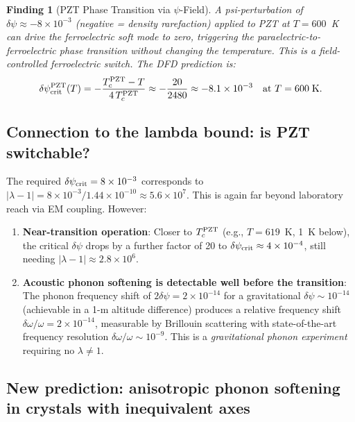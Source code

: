 \documentclass[11pt]{article}
\newtheorem{finding}{Finding}
\newcommand{\ee}[1]{\times 10^{#1}}
\begin{document}
\begin{finding}[PZT Phase Transition via $\psi$-Field]
A psi-perturbation of $\delta\psi \approx -8\ee{-3}$ (negative = density
rarefaction) applied to PZT at $T = 600$~K can drive the ferroelectric
soft mode to zero, triggering the paraelectric-to-ferroelectric phase
transition without changing the temperature. This is a \emph{field-controlled
ferroelectric switch}. The DFD prediction is:
\begin{equation}
\delta\psi_{\rm crit}^{\rm PZT}(T) = -\frac{T_c^{\rm PZT} - T}{4\,T_c^{\rm PZT}}
\approx -\frac{20}{2480} \approx -8.1\ee{-3}
\quad\text{at }T = 600\;\text{K}.
\end{equation}
\end{finding}

\subsection{Connection to the lambda bound: is PZT switchable?}

The required $\delta\psi_{\rm crit} = 8\ee{-3}$ corresponds to
$|\lambda-1| = 8\ee{-3}/1.44\ee{-10} \approx 5.6\ee{7}$. This is
again far beyond laboratory reach via EM coupling. However:

\begin{enumerate}
\item \textbf{Near-transition operation}: Closer to $T_c^{\rm PZT}$ (e.g.,
  $T = 619$~K, 1~K below), the critical $\delta\psi$ drops by a further
  factor of 20 to $\delta\psi_{\rm crit} \approx 4\ee{-4}$, still needing
  $|\lambda-1| \approx 2.8\ee{6}$.
\item \textbf{Acoustic phonon softening is detectable well before
  the transition}: The phonon frequency shift of $2\delta\psi = 2\ee{-14}$
  for a gravitational $\delta\psi \sim 10^{-14}$ (achievable in a 1-m
  altitude difference) produces a relative frequency shift
  $\delta\omega/\omega = 2\ee{-14}$, measurable by Brillouin scattering with
  state-of-the-art frequency resolution $\delta\omega/\omega \sim 10^{-9}$.
  This is a \emph{gravitational phonon experiment} requiring no $\lambda \neq 1$.
\end{enumerate}

\subsection{New prediction: anisotropic phonon softening in crystals with
inequivalent axes}
\end{document}
